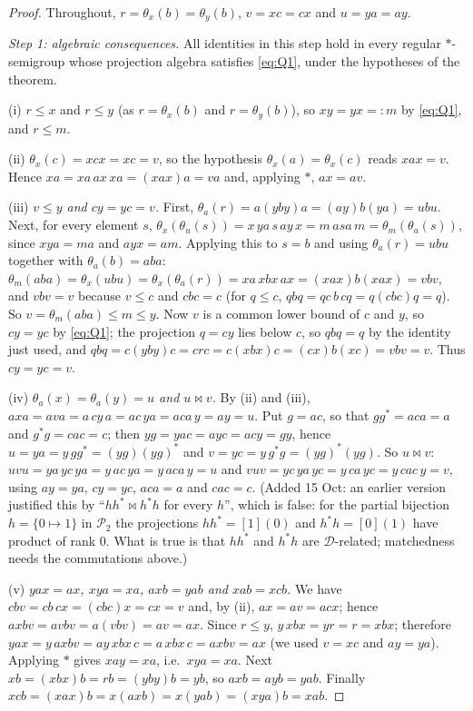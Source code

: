 \documentclass[11pt]{amsart}
\theoremstyle{definition}
\newcommand{\D}{\mathcal{D}}
\renewcommand{\P}{\mathcal{P}}
\newcommand{\mt}{\bowtie}   %
\begin{document}
\begin{proof}
Throughout, $r=\theta_x(b)=\theta_y(b)$, $v=xc=cx$ and $u=ya=ay$.

\smallskip
\emph{Step 1: algebraic consequences.} All identities in this step hold in every regular $*$-semigroup whose projection algebra satisfies \eqref{eq:Q1}, under the hypotheses of the theorem.

(i) $r\le x$ and $r\le y$ (as $r=\theta_x(b)$ and $r=\theta_y(b)$), so $xy=yx=:m$ by \eqref{eq:Q1}, and $r\le m$.

(ii) $\theta_x(c)=xcx=xc=v$, so the hypothesis $\theta_x(a)=\theta_x(c)$ reads $xax=v$. Hence $xa=xa\,ax\,xa=(xax)a=va$ and, applying $*$, $ax=av$.

(iii) \emph{$v\le y$ and $cy=yc=v$.} First, $\theta_a(r)=a(yby)a=(ay)b(ya)=ubu$. Next, for every element $s$, $\theta_x(\theta_u(s))=x\,ya\,s\,ay\,x=m\,a s a\,m=\theta_m(\theta_a(s))$, since $xya=ma$ and $ayx=am$. Applying this to $s=b$ and using $\theta_a(r)=ubu$ together with $\theta_a(b)=aba$: $\theta_m(aba)=\theta_x(ubu)=\theta_x(\theta_a(r))=xa\,xbx\,ax=(xax)b(xax)=vbv$, and $vbv=v$ because $v\le c$ and $cbc=c$ (for $q\le c$, $qbq=qc\,b\,cq=q(cbc)q=q$). So $v=\theta_m(aba)\le m\le y$. Now $v$ is a common lower bound of $c$ and $y$, so $cy=yc$ by \eqref{eq:Q1}; the projection $q=cy$ lies below $c$, so $qbq=q$ by the identity just used, and $qbq=c(yby)c=crc=c(xbx)c=(cx)b(xc)=vbv=v$. Thus $cy=yc=v$.

(iv) \emph{$\theta_a(x)=\theta_a(y)=u$ and $u\mt v$.} By (ii) and (iii), $axa=ava=a\,cy\,a=ac\,ya=aca\,y=ay=u$. Put $g=ac$, so that $gg^*=aca=a$ and $g^*g=cac=c$; then $yg=yac=ayc=acy=gy$, hence $u=ya=y\,gg^*=(yg)(yg)^*$ and $v=yc=y\,g^*g=(yg)^*(yg)$. So $u\mt v$: $uvu=ya\,yc\,ya=y\,ac\,ya=y\,aca\,y=u$ and $vuv=yc\,ya\,yc=y\,ca\,yc=y\,cac\,y=v$, using $ay=ya$, $cy=yc$, $aca=a$ and $cac=c$. (Added 15 Oct: an earlier version justified this by ``$hh^*\mt h^*h$ for every $h$'', which is false: for the partial bijection $h=\{0\mapsto1\}$ in $\P_2$ the projections $hh^*=[1](0)$ and $h^*h=[0](1)$ have product of rank $0$. What is true is that $hh^*$ and $h^*h$ are $\D$-related; matchedness needs the commutations above.)

(v) \emph{$yax=ax$, $xya=xa$, $axb=yab$ and $xab=xcb$.} We have $cbv=cb\,cx=(cbc)x=cx=v$ and, by (ii), $ax=av=acx$; hence $axbv=avbv=a(vbv)=av=ax$. Since $r\le y$, $y\,xbx=yr=r=xbx$; therefore $yax=y\,axbv=ay\,xbx\,c=a\,xbx\,c=axbv=ax$ (we used $v=xc$ and $ay=ya$). Applying $*$ gives $xay=xa$, i.e.\ $xya=xa$. Next $xb=(xbx)b=rb=(yby)b=yb$, so $axb=ayb=yab$. Finally $xcb=(xax)b=x(axb)=x(yab)=(xya)b=xab$.


\end{proof}
\end{document}
